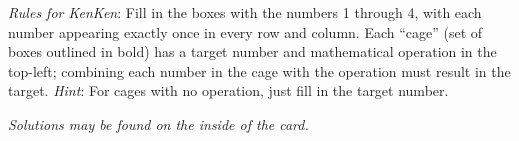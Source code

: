 \documentclass{article}
\newcounter{row}
\newcounter{col}
\begin{document}
\bigskip

\textit{Rules for KenKen}: Fill in the boxes with the numbers 1 through 4, with
each number appearing exactly once in every row and column.  Each
``cage'' (set of boxes outlined in bold) has a target number
and mathematical operation in the top-left; combining each
number in the cage with the operation must result in the target.
\textit{Hint}: For cages with no operation, just fill in the
  target number.

\begin{center}
\it Solutions may be found on the inside of the card.
\end{center}
\end{document}
